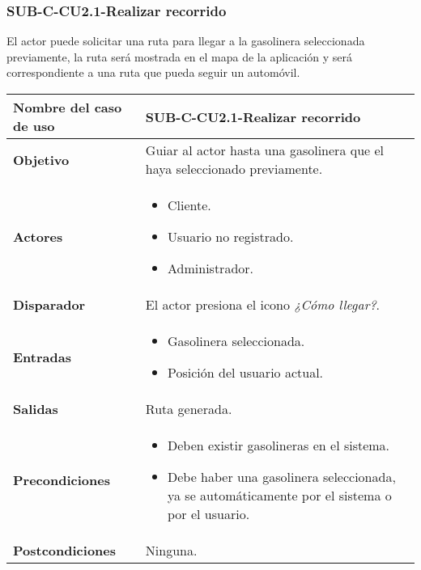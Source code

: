\subsubsection{SUB-C-CU2.1-Realizar recorrido}\label{SUB-C-CU2.1}
El actor puede solicitar una ruta para llegar a la gasolinera seleccionada previamente, la ruta será mostrada en el mapa de la aplicación y será correspondiente a una ruta que pueda seguir un automóvil.

\begin{longtable}{|J{5cm}|J{10.3cm}|}
	\hline
	\textbf{Nombre del caso de uso} &
		SUB-C-CU2.1-Realizar recorrido \\ \hline
	\textbf{Objetivo} &
		Guiar al actor hasta una gasolinera que el haya seleccionado previamente. \\ \hline
	\textbf{Actores} &
		\begin{itemize}
			\item Cliente.
			\item Usuario no registrado.
			\item Administrador.
		\end{itemize}
		 \\ \hline 
	\textbf{Disparador} & 
		El actor presiona el icono \textit{¿Cómo llegar?}. \\ \hline 
	\textbf{Entradas} & 
		\begin{itemize}
				\item Gasolinera seleccionada.
				\item Posición del usuario actual.
		\end{itemize}\\ \hline 
	\textbf{Salidas} & Ruta generada.
		\\ \hline
	\textbf{Precondiciones} &
		\begin{itemize}
			\item Deben existir gasolineras en el sistema.
			\item Debe haber una gasolinera seleccionada, ya se automáticamente por el sistema o por el usuario.
		\end{itemize} 
		\\ \hline
	\textbf{Postcondiciones} & Ninguna.
		\\ \hline

\end{longtable}
